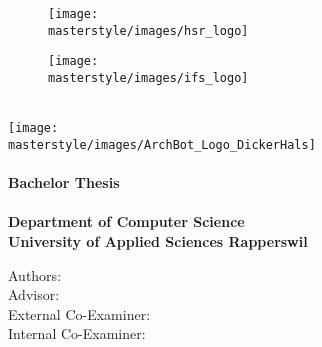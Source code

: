 \begin{titlepage}
\begin{flushleft}

\begin{figure}[tbp]
  \begin{minipage}[c]{0.4\textwidth}
    \texttt{[image: \\masterstyle/images/hsr\_logo]}
  \end{minipage}
  \hfill
  \begin{minipage}[c]{0.3\textwidth}
    \texttt{[image: \\masterstyle/images/ifs\_logo]}
  \end{minipage}
\end{figure}

\noindent\begin{minipage}[t]{0.49\textwidth}
  \begin{flushleft}
    \vspace{0pt}
  \end{flushleft}
\end{minipage}
\hfill
\begin{minipage}[t]{0.49\textwidth}
  \begin{flushright}
    \vspace{0pt}
  \end{flushright}
\end{minipage}
\\[4cm]

\texttt{[image: \\masterstyle/images/ArchBot\_Logo\_DickerHals]}\\[2cm]
{\Huge \bfseries \TITLE}\\[1cm]
{\huge \bfseries Bachelor Thesis}\\[0.7cm]
{\large \bfseries \SEMESTER}\\[0.3cm]
{\large \bfseries Department of Computer Science}\\
{\large \bfseries University of Applied Sciences Rapperswil}\\

\vfill

Authors: \AUTHOR \\
Advisor: \SUPERVISOR \\
External Co-Examiner: \EXPERTE \\
Internal Co-Examiner: \GEGENLESER \\

\end{flushleft}
\end{titlepage}
